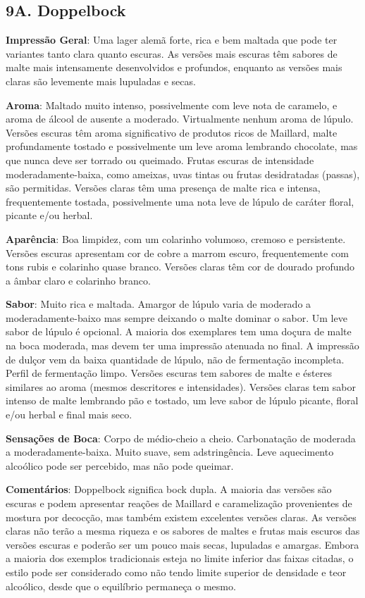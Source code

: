 \subsection*{9A. Doppelbock}
\textbf{Impressão Geral}: Uma lager alemã forte, rica e bem maltada que pode ter variantes tanto clara quanto escuras. As versões mais escuras têm sabores de malte mais intensamente desenvolvidos e profundos, enquanto as versões mais claras são levemente mais lupuladas e secas.

\textbf{Aroma}: Maltado muito intenso, possivelmente com leve nota de caramelo, e aroma de álcool de ausente a moderado. Virtualmente nenhum aroma de lúpulo. Versões escuras têm aroma significativo de produtos ricos de Maillard, malte profundamente tostado e possivelmente um leve aroma lembrando chocolate, mas que nunca deve ser torrado ou queimado. Frutas escuras de intensidade moderadamente-baixa, como ameixas, uvas tintas ou frutas desidratadas (passas), são permitidas. Versões claras têm uma presença de malte rica e intensa, frequentemente tostada, possivelmente uma nota leve de lúpulo de caráter floral, picante e/ou herbal.

\textbf{Aparência}: Boa limpidez, com um colarinho volumoso, cremoso e persistente. Versões escuras apresentam cor de cobre a marrom escuro, frequentemente com tons rubis e colarinho quase branco. Versões claras têm cor de dourado profundo a âmbar claro e colarinho branco.

\textbf{Sabor}: Muito rica e maltada. Amargor de lúpulo varia de moderado a moderadamente-baixo mas sempre deixando o malte dominar o sabor. Um leve sabor de lúpulo é opcional. A maioria dos exemplares tem uma doçura de malte na boca moderada, mas devem ter uma impressão atenuada no final. A impressão de dulçor vem da baixa quantidade de lúpulo, não de fermentação incompleta. Perfil de fermentação limpo. Versões escuras tem sabores de malte e ésteres similares ao aroma (mesmos descritores e intensidades). Versões claras tem sabor intenso de malte lembrando pão e tostado, um leve sabor de lúpulo picante, floral e/ou herbal e final mais seco.

\textbf{Sensações de Boca}: Corpo de médio-cheio a cheio. Carbonatação de moderada a moderadamente-baixa. Muito suave, sem adstringência. Leve aquecimento alcoólico pode ser percebido, mas não pode queimar.

\textbf{Comentários}: Doppelbock significa bock dupla. A maioria das versões são escuras e podem apresentar reações de Maillard e caramelização provenientes de mostura por decocção, mas também existem excelentes versões claras. As versões claras não terão a mesma riqueza e os sabores de maltes e frutas mais escuros das versões escuras e poderão ser um pouco mais secas, lupuladas e amargas. Embora a maioria dos exemplos tradicionais esteja no limite inferior das faixas citadas, o estilo pode ser considerado como não tendo limite superior de densidade e teor alcoólico, desde que o equilíbrio permaneça o mesmo.

